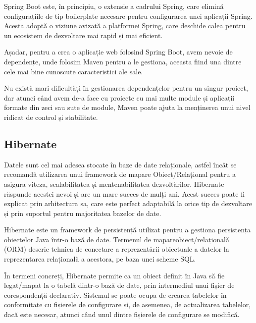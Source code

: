 Spring Boot este, în principiu, o extensie a cadrului Spring, care elimină configurațiile de tip boilerplate necesare pentru configurarea unei aplicații Spring. Acesta adoptă o viziune avizată a platformei Spring, care deschide calea pentru un ecosistem de dezvoltare mai rapid și mai eficient.\newline

Așadar, pentru a crea o aplicație web folosind Spring Boot, avem nevoie de dependențe, unde folosim Maven pentru a le gestiona, aceasta fiind una dintre cele mai bine cunoscute caracteristici ale sale.\newline

Nu există mari dificultăți în gestionarea dependențelor pentru un singur proiect, dar atunci când avem de-a face cu proiecte cu mai multe module și aplicații formate din zeci sau sute de module, Maven poate ajuta la menținerea unui nivel ridicat de control și stabilitate.\newline

\subsection{Hibernate}

Datele sunt cel mai adesea stocate în baze de date relaționale, astfel încât se recomandă utilizarea unui framework de mapare Obiect/Relațional pentru a asigura viteza, scalabilitatea și mentenabilitatea dezvoltărilor. Hibernate\cite{.hibernate} răspunde acestei nevoi și are un mare succes de mulți ani. Acest succes poate fi explicat prin arhitectura sa, care este perfect adaptabilă la orice tip de dezvoltare și prin suportul pentru majoritatea bazelor de date.\newline

Hibernate este un framework de persistență utilizat pentru a gestiona persistența obiectelor Java într-o bază de date. Termenul de mapare\newline obiect/relațională (ORM) descrie tehnica de conectare a reprezentării obiectuale a datelor la reprezentarea relațională a acestora, pe baza unei scheme SQL.\newline

În termeni concreți, Hibernate permite ca un obiect definit în Java să fie legat/mapat la o tabelă dintr-o bază de date, prin intermediul unui fișier de corespondență declarativ. Sistemul se poate ocupa de crearea tabelelor în conformitate cu fișierele de configurare și, de asemenea, de actualizarea tabelelor, dacă este necesar, atunci când unul dintre fișierele de configurare se modifică.\newline

